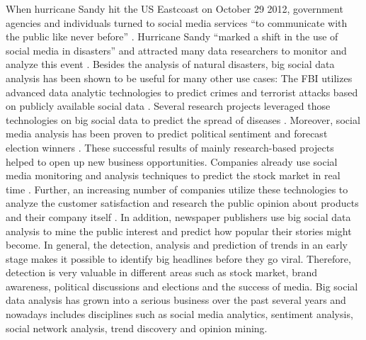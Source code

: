 When hurricane Sandy hit the US Eastcoast on October 29 2012, government agencies and individuals turned to social media services \enquote{to communicate with the public like never before} \cite{emergencymgmt2013sandy}. Hurricane Sandy \enquote{marked a shift in the use of social media in disasters} \cite[6]{security13sandy} and attracted many data researchers to monitor and analyze this event \cite{kumar2011tweettracker,carageamapping2014sandy}. Besides the analysis of natural disasters, big social data analysis has been shown to be useful for many other use cases: The FBI utilizes advanced data analytic technologies to predict crimes and terrorist attacks based on publicly available social data \cite{wang2012automatic}. Several research projects leveraged those technologies on big social data to predict the spread of diseases \cite{Google09detection,gft2014}. Moreover, social media analysis has been proven to predict political sentiment and forecast election winners \cite{bermingham2011using}. These successful results of mainly research-based projects helped to open up new business opportunities. Companies already use social media monitoring and analysis techniques to predict the stock market in real time \cite{bollen2011twitter,alcorn2013stockmarket}. Further, an increasing number of companies utilize these technologies to analyze the customer satisfaction and research the public opinion about products and their company itself \cite{journals/expert/CambriaSXH13}. In addition, newspaper publishers use big social data analysis to mine the public interest and predict how popular their stories might become. In general, the detection, analysis and prediction of trends in an early stage makes it possible to identify big headlines before they go viral. Therefore, detection is very valuable in different areas such as stock market, brand awareness, political discussions and elections and the success of media. 
Big social data analysis has grown into a serious business over the past several years and nowadays includes disciplines such as social media analytics, sentiment analysis, social network analysis, trend discovery and opinion mining.


